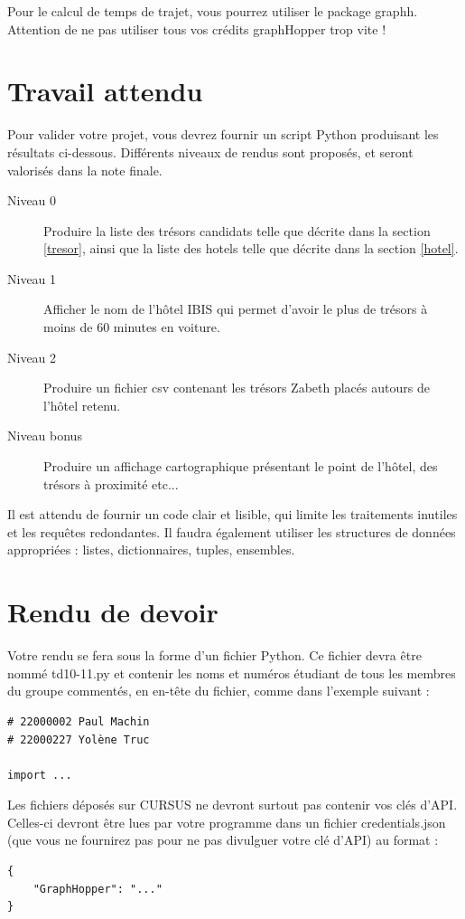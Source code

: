 \documentclass[11pt,a4paper]{article}
\begin{document}
Pour le calcul de temps de trajet, vous pourrez utiliser le package graphh. Attention de ne pas utiliser tous vos crédits graphHopper trop vite !
\section{Travail attendu}

Pour valider votre projet, vous devrez fournir un script Python produisant les résultats ci-dessous.
 Différents niveaux de rendus sont proposés, et seront valorisés dans la note finale. 

\begin{description}
    \item [Niveau 0] Produire la liste des trésors candidats telle que décrite dans la section \ref{tresor}, ainsi que la liste des hotels telle que décrite dans la section \ref{hotel}.
    \item[Niveau 1] Afficher le nom de l'hôtel IBIS qui permet d'avoir le plus de trésors à moins de 60 minutes en voiture. 
    \item[Niveau 2] Produire un fichier csv contenant les trésors Zabeth placés autours de l'hôtel retenu.
    \item[Niveau bonus] Produire un affichage cartographique présentant le point de l'hôtel, des trésors à proximité etc...
\end{description}

Il est attendu de fournir un code clair et lisible, qui limite les traitements inutiles et les requêtes redondantes. Il faudra également utiliser les structures de données appropriées :  listes, dictionnaires, tuples, ensembles.
\newpage
\section{Rendu de devoir}
Votre rendu se fera sous la forme d’un
fichier Python. Ce fichier devra être nommé td10-11.py et contenir les noms et numéros étudiant de tous
les membres du groupe commentés, en en-tête du fichier, comme dans l’exemple suivant :
\begin{verbatim}
# 22000002 Paul Machin
# 22000227 Yolène Truc

import ...
\end{verbatim}
Les fichiers déposés sur CURSUS ne devront surtout pas contenir vos clés d’API. Celles-ci devront être lues par votre programme dans un fichier credentials.json (que vous ne fournirez pas pour ne pas divulguer votre clé d’API) au format :
\begin{verbatim}
{
    "GraphHopper": "..."
}
\end{verbatim}
\end{document}

